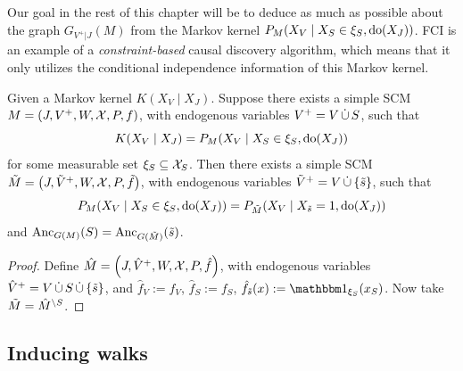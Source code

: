 Our goal in the rest of this chapter will be to deduce as much as possible about the graph $G_{V^+|J}(M)$ from the Markov kernel $P_{M}(X_V \mid X_S \in \xi_S, \operatorname{do}(X_J))$. 
FCI is an example of a \emph{constraint-based} causal discovery algorithm, which means that it only utilizes the conditional independence information of this Markov kernel.

\begin{Prp}
  Given a Markov kernel $K(X_V \mid X_J)$.
  Suppose there exists a simple SCM $M = \left ( J, V^+, W, \mathcal{X}, P, f \right )$, with endogenous variables $V^+ = V \,\dot{\cup}\, S$,
  such that
  $$K(X_V \mid X_J) = P_M(X_V \mid X_S \in \xi_S, \operatorname{do}(X_J))$$
  for some measurable set $\xi_S \subseteq \mathcal{X}_S$.
  Then there exists a simple SCM $\tilde{M} = \left ( J, \tilde{V}^+, W, \mathcal{X}, P, \tilde{f} \right )$, with endogenous variables $\tilde{V}^+ = V \,\dot{\cup}\, \{\tilde{s}\}$,
  such that
  $$P_M(X_V \mid X_S \in \xi_S, \operatorname{do}(X_J)) = P_{\tilde M}(X_V \mid X_{\tilde s} = 1, \operatorname{do}(X_J))$$
  and $\mathrm{Anc}_{G(M)}(S) = \mathrm{Anc}_{G(\tilde{M})}(\tilde{s})$.
\end{Prp}
\begin{proof}
  Define $\hat{M} = \left ( J, \hat{V}^+, W, \mathcal{X}, P, \hat{f} \right )$, with endogenous variables $\hat{V}^+ = V \,\dot{\cup}\, S \,\dot{\cup}\, \{\tilde{s}\}$,
  and $\hat{f}_V := f_V$, $\hat{f}_S := f_S$, $\hat{f}_{\tilde{s}}(x) := \ind_{\xi_S}(x_{S})$.
  Now take $\tilde{M} = \hat{M}^{\setminus S}$.
\end{proof}

\subsection{Inducing walks}

